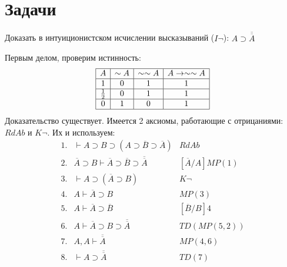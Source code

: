 \section*{Задачи}

\begin{task}\label{Theorem:I-int}
    Доказать в интуиционистском исчислении высказываний ($I\lnot$): $A \supset \overline{\overline{A}}$
\end{task}
\begin{solution}
    Первым делом, проверим истинность:
    \begin{equation*}
        \begin{array}{|c|c|c|c|c|}\hline
            A            & \sim A & \sim \sim A & A \to \sim\sim A \\\hline
            1            & 0      & 1           & 1 \\\hline
            \frac{1}{2}  & 0      & 1           & 1 \\\hline
            0            & 1      & 0           & 1 \\\hline
        \end{array}
    \end{equation*}
    Доказательство существует. Имеется 2 аксиомы, работающие с отрицаниями: $RdAb$ и $K\lnot$. Их и используем:
    \begin{equation*}
    \begin{array}{llr}
        1.  & \vdash A \supset B \supset (A \supset \overline{B} \supset \overline{A})
            & RdAb
            \\
        2.  & \overline{A} \supset B \vdash \overline{A} \supset \overline{B} \supset \overline{\overline{A}} 
            & [\overline{A}/A]MP(1)
            \\
        3.  & \vdash A \supset (\overline{A} \supset B)
            & K\lnot
            \\
        4.  & A \vdash \overline{A} \supset B
            & MP(3)
            \\
        5.  & A \vdash \overline{A} \supset \overline{B}
            & [\overline{B}/B]4
            \\
        6.  & A \vdash \overline{A} \supset B \supset \overline{\overline{A}}
            & TD(MP(5,2))
            \\
        7.  & A, A \vdash \overline{\overline{A}}
            & MP(4,6)
            \\
        8.  & \vdash A \supset \overline{\overline{A}}
            & TD(7)
            \\
    \end{array}
    \end{equation*}
\end{solution}

